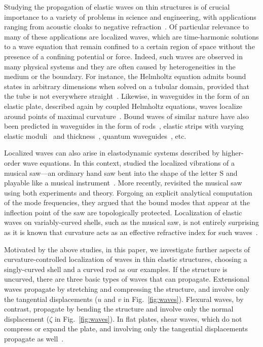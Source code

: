 Studying the propagation of elastic waves on thin structures is of crucial importance to a variety of problems in science and engineering, with applications ranging from acoustic cloaks to negative refraction~\cite{farhat2009,craster2012,zangeneh-nejad2019}.
Of particular relevance to many of these applications are localized waves, which are time-harmonic solutions to a wave equation that remain confined to a certain region of space without the presence of a confining potential or force.
Indeed, such waves are observed in many physical systems and they are often caused by heterogeneities in the medium or the boundary.
For instance, the Helmholtz equation admits bound states in arbitrary dimensions when solved on a tubular domain, provided that the tube is not everywhere straight~\cite{goldstone1992}.
Likewise, in waveguides in the form of an elastic plate, described again by coupled Helmholtz equations, waves localize around points of maximal curvature~\cite{gridin2005}.
Bound waves of similar nature have also been predicted in waveguides in the form of rods~\cite{gridin2005a}, elastic strips with varying elastic moduli~\cite{forster2006} and thickness~\cite{postnova2008}, quantum waveguides~\cite{duclos1995}, etc.

Localized waves can also arise in elastodynamic systems described by higher-order wave equations.
In this context, \citet{scott1992} studied the localized vibrations of a musical saw---an ordinary hand saw bent into the shape of the letter \textsf{S} and playable like a musical instrument~\cite{leonard1989,stuckenbruck2016}.
More recently, \citet{shankar2022} revisited the musical saw using both experiments and theory.
Forgoing an explicit analytical computation of the mode frequencies, they argued that the bound modes that appear at the inflection point of the saw are topologically protected.
Localization of elastic waves on variably-curved shells, such as the musical saw, is not entirely surprising as it is known that curvature acts as an effective refractive index for such waves~\cite{norris1994,evans2013}.

Motivated by the above studies, in this paper, we investigate further aspects of curvature-controlled localization of waves in thin elastic structures, choosing a singly-curved shell and a curved rod as our examples.
If the structure is uncurved, there are three basic types of waves that can propagate.
Extensional waves propagate by stretching and compressing the structure, and involve only the tangential displacements ($u$ and $v$ in Fig.~\ref{fig:waves}).
Flexural waves, by contrast, propagate by bending the structure and involve only the normal displacement ($\zeta$ in Fig.~\ref{fig:waves}).
In flat plates, shear waves, which do not compress or expand the plate, and involving only the tangential displacements propagate as well~\cite{landau1986}.

